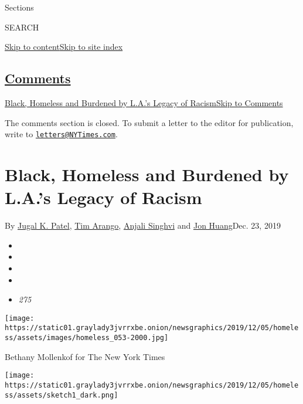 Sections

SEARCH

\protect\hyperlink{site-content}{Skip to
content}\protect\hyperlink{site-index}{Skip to site index}

\hypertarget{comments}{%
\subsection{\texorpdfstring{\protect\hyperlink{commentsContainer}{Comments}}{Comments}}\label{comments}}

\href{}{Black, Homeless and Burdened by L.A.'s Legacy of
Racism}\href{}{Skip to Comments}

The comments section is closed. To submit a letter to the editor for
publication, write to
\href{mailto:letters@NYTimes.com}{\nolinkurl{letters@NYTimes.com}}.

\hypertarget{black-homeless-and-burdened-by-las-legacy-of-racism}{%
\section{Black, Homeless and Burdened by L.A.'s Legacy of
Racism}\label{black-homeless-and-burdened-by-las-legacy-of-racism}}

By \href{https://www.nytimes3xbfgragh.onion/by/jugal-k-patel}{Jugal K.
Patel}, \href{https://www.nytimes3xbfgragh.onion/by/tim-arango}{Tim
Arango},
\href{https://www.nytimes3xbfgragh.onion/by/anjali-singhvi}{Anjali
Singhvi} and \href{https://www.nytimes3xbfgragh.onion/by/jon-huang}{Jon
Huang}Dec. 23, 2019

\begin{itemize}
\item
\item
\item
\item
\item
  \emph{275}
\end{itemize}

\texttt{[image: https://static01.graylady3jvrrxbe.onion/newsgraphics/2019/12/05/homeless/assets/images/homeless\_053-2000.jpg]}

Bethany Mollenkof for The New York Times

\texttt{[image: https://static01.graylady3jvrrxbe.onion/newsgraphics/2019/12/05/homeless/assets/sketch1\_dark.png]}

